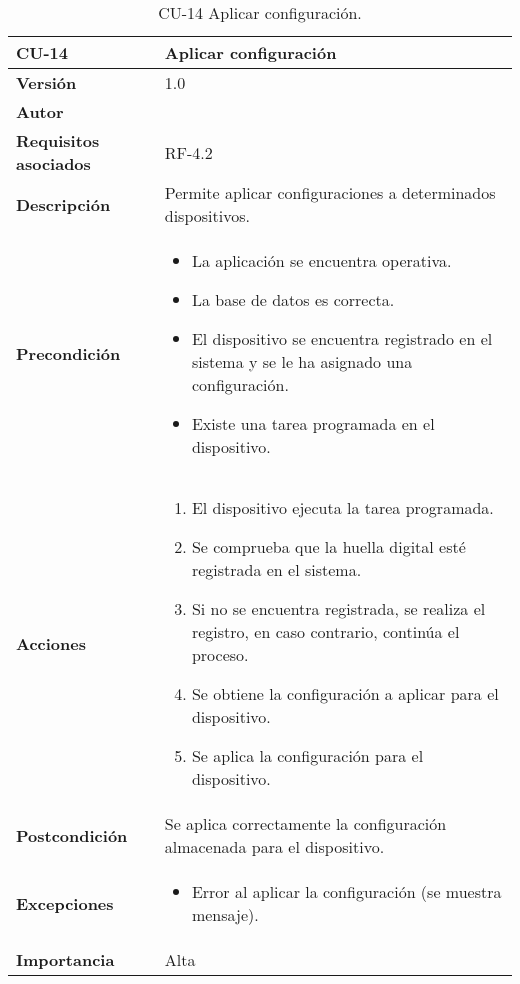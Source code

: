 \begin{table}[p]
	\centering
	\begin{tabularx}{\linewidth}{ p{} p{} }
		\toprule
		\textbf{CU-14}    & \textbf{ Aplicar configuración}\\
		\toprule
		\textbf{Versión}              & 1.0    \\
		\textbf{Autor}                & \@author{} \\
		\textbf{Requisitos asociados} & RF-4.2\\
		\textbf{Descripción}          & Permite aplicar configuraciones a determinados dispositivos. \\
		\textbf{Precondición}         &
		\begin{itemize}
			\tightlist
			\item La aplicación se encuentra operativa.
			\item La base de datos es correcta.
			\item El dispositivo se encuentra registrado en el sistema y se le ha asignado una configuración.
			\item Existe una tarea programada en el dispositivo.
		\end{itemize}\\
		\textbf{Acciones}             &
		\begin{enumerate}
			\tightlist
			\item El dispositivo ejecuta la tarea programada.
			\item Se comprueba que la huella digital esté registrada en el sistema.
			\item Si no se encuentra registrada, se realiza el registro, en caso contrario, continúa el proceso.
			\item Se obtiene la configuración a aplicar para el dispositivo.
			\item Se aplica la configuración para el dispositivo.
		\end{enumerate}\\
		\textbf{Postcondición}        & Se aplica correctamente la configuración almacenada para el dispositivo.\\
		\textbf{Excepciones}          &
		\begin{itemize}
			\tightlist
			\item Error al aplicar la configuración (se muestra mensaje).
		\end{itemize}\\
		\textbf{Importancia}          & Alta\\
		\bottomrule
	\end{tabularx}
	\caption{CU-14 Aplicar configuración.}\label{tab:table-14}
\end{table}

